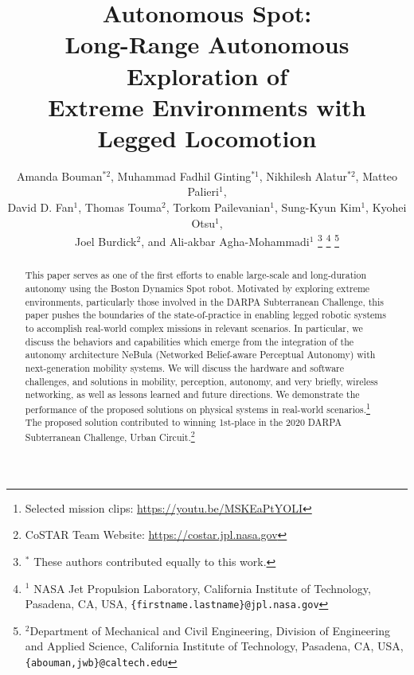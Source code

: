 \documentclass[letterpaper, 10pt, conference]{ieeeconf}      %
\title{\LARGE \bf
Autonomous Spot: \\
Long-Range Autonomous Exploration of \\Extreme Environments with Legged Locomotion
}
\author{Amanda Bouman$^{*2}$, Muhammad Fadhil Ginting$^{*1}$, Nikhilesh Alatur$^{*2}$, Matteo Palieri$^{1}$, \\
David D. Fan$^{1}$, Thomas Touma$^{2}$, Torkom Pailevanian$^{1}$, Sung-Kyun Kim$^{1}$, Kyohei Otsu$^{1}$,\\
Joel Burdick$^{2}$, and Ali-akbar Agha-Mohammadi$^{1}$%
\thanks{$^*$ These authors contributed equally to this work.}
\thanks{$^{1}$ NASA Jet Propulsion Laboratory, California Institute of Technology, Pasadena, CA, USA,
     {\tt\small \{firstname.lastname\}@jpl.nasa.gov}}%
\thanks{$^{2}$Department of Mechanical and Civil Engineering, Division of Engineering and Applied Science, California Institute of Technology, Pasadena, CA, USA,
         {\tt\small \{abouman,jwb\}@caltech.edu}}%
}
\newcommand{\rev}[1]{{\color{blue}#1}} %
\begin{document}
\maketitle
\thispagestyle{empty}
\pagestyle{empty}
\begin{abstract}
This paper serves as one of the first efforts to enable large-scale and long-duration autonomy using the Boston Dynamics Spot robot. Motivated by exploring extreme environments, particularly those involved in the DARPA Subterranean Challenge, this paper pushes the boundaries of the state-of-practice in enabling legged robotic systems to accomplish real-world complex missions in relevant scenarios. 
In particular, we discuss the behaviors and capabilities which emerge from the integration of the autonomy architecture NeBula (Networked Belief-aware Perceptual Autonomy) with next-generation mobility systems.
We will discuss the hardware and software challenges, and solutions in mobility, perception, autonomy, and very briefly, wireless networking, as well as lessons learned and future directions. 
We demonstrate the performance of the proposed solutions on physical systems in real-world scenarios.\footnote[3]{Selected mission clips: \url{https://youtu.be/MSKEaPtYOLI}}
The proposed solution contributed to winning 1st-place in the 2020 DARPA Subterranean Challenge, Urban Circuit.\footnote[4]{CoSTAR Team Website: \url{https://costar.jpl.nasa.gov}}
\end{abstract}
\end{document}
